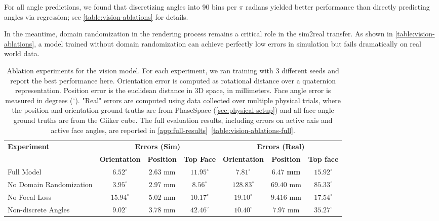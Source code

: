 For all angle predictions, we found that discretizing angles into 90 bins per $\pi$ radians yielded better performance than directly predicting angles via regression; see \autoref{table:vision-ablations} for details.

In the meantime, domain randomization in the rendering process remains a critical role in the sim2real transfer. As shown in \autoref{table:vision-ablations}, a model trained without domain randomization can achieve perfectly low errors in simulation but fails dramatically on real world data.

\begin{center}
\begin{table}[h]
    \caption{Ablation experiments for the vision model. For each experiment, we ran training with 3 different seeds and report the best performance here. Orientation error is computed as rotational distance over a quaternion representation. Position error is the euclidean distance in 3D space, in millimeters. Face angle error is measured in degrees ($^{\circ}$). "Real" errors are computed using data collected over multiple physical trials, where the position and orientation ground truths are from PhaseSpace (\autoref{sec:physical-setup}) and all face angle ground truths are from the Giiker cube. The full evaluation results, including errors on active axis and active face angles, are reported in \autoref{app:full-results}~\autoref{table:vision-ablations-full}.}
    \label{table:vision-ablations}
    \centering
    \renewcommand{\arraystretch}{1.3}
    \begin{tabular}{l c c c | c c c}
        \toprule
        \multirow{2}{*}{\textbf{Experiment}} 
        & \multicolumn{3}{c}{\textbf{Errors (Sim)}} 
        & \multicolumn{3}{c}{\textbf{Errors (Real)}} \\
        & \textbf{Orientation} & \textbf{Position} & \textbf{Top Face} & \textbf{Orientation} & \textbf{Position} & \textbf{Top face} \\
        \midrule
        Full Model & $6.52^\circ$ & $\mathbf{2.63}$ mm & $11.95^\circ$ & $\mathbf{7.81^\circ}$ & $\mathbf{6.47}$ \textbf{mm} & $\mathbf{15.92^\circ}$ \\
        \midrule
        No Domain Randomization & $\mathbf{3.95^\circ}$ & $2.97$ mm & $\mathbf{8.56^\circ}$ & $128.83^\circ$ & $69.40$ mm & $85.33^\circ$  \\
        No Focal Loss & $15.94^\circ$ & $5.02$ mm & $10.17^\circ$ & $19.10^\circ$ & $9.416$ mm & $17.54^\circ$ \\
        Non-discrete Angles & $9.02^\circ$ & $3.78$ mm & $42.46^\circ$ & $10.40^\circ$ & $7.97$ mm & $35.27^\circ$  \\
        \bottomrule
    \end{tabular}
\end{table}
\end{center}



